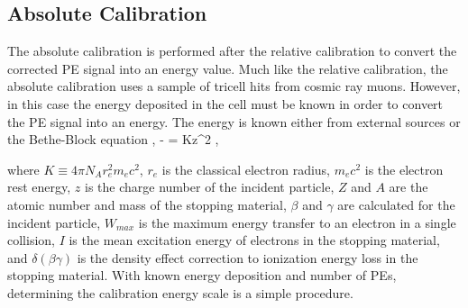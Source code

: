 \subsection{Absolute Calibration}

The absolute calibration is performed after the relative calibration to convert the corrected PE signal into an energy value. Much like the relative calibration, the absolute calibration uses a sample of tricell hits from cosmic ray muons. However, in this case the energy deposited in the cell must be known in order to convert the PE signal into an energy. The energy is known either from external sources \cite{ref:MuonTables} or the Bethe-Block equation \cite{ref:PDG},
\beq
\left\langle- \right\rangle = Kz^2   ,
\label{eq:BetheBlock}
\eeq

\n where $K \equiv 4\pi N_A r^2_e m_e c^2$, $r_e$ is the classical electron radius, $m_e c^2$ is the electron rest energy, $z$ is the charge number of the incident particle, $Z$ and $A$ are the atomic number and mass of the stopping material, $\beta$ and $\gamma$ are calculated for the incident particle, $W_{max}$ is the maximum energy transfer to an electron in a single collision, $I$ is the mean excitation energy of electrons in the stopping material, and $\delta(\beta\gamma)$ is the density effect correction to ionization energy loss in the stopping material. With known energy deposition and number of PEs, determining the calibration energy scale is a simple procedure.

